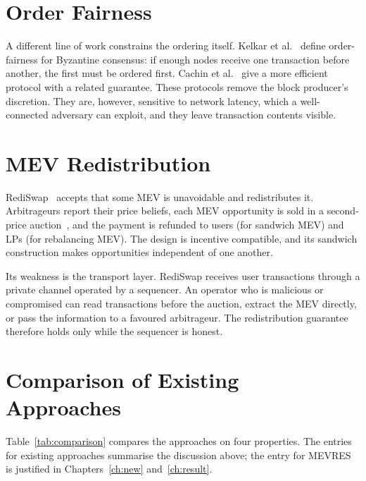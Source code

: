 \section{Order Fairness}

A different line of work constrains the ordering itself. Kelkar et al.~\cite{kelkar2020order} define order-fairness for Byzantine consensus: if enough nodes receive one transaction before another, the first must be ordered first. Cachin et al.~\cite{cachin2022quick} give a more efficient protocol with a related guarantee. These protocols remove the block producer's discretion. They are, however, sensitive to network latency, which a well-connected adversary can exploit, and they leave transaction contents visible.

\section{MEV Redistribution}

RediSwap~\cite{zhang2024rediswap} accepts that some MEV is unavoidable and redistributes it. Arbitrageurs report their price beliefs, each MEV opportunity is sold in a second-price auction~\cite{vickrey1961counterspeculation}, and the payment is refunded to users (for sandwich MEV) and LPs (for rebalancing MEV). The design is incentive compatible, and its sandwich construction makes opportunities independent of one another.

Its weakness is the transport layer. RediSwap receives user transactions through a private channel operated by a sequencer. An operator who is malicious or compromised can read transactions before the auction, extract the MEV directly, or pass the information to a favoured arbitrageur. The redistribution guarantee therefore holds only while the sequencer is honest.

\section{Comparison of Existing Approaches}

Table~\ref{tab:comparison} compares the approaches on four properties. The entries for existing approaches summarise the discussion above; the entry for MEVRES is justified in Chapters~\ref{ch:new} and~\ref{ch:result}.

